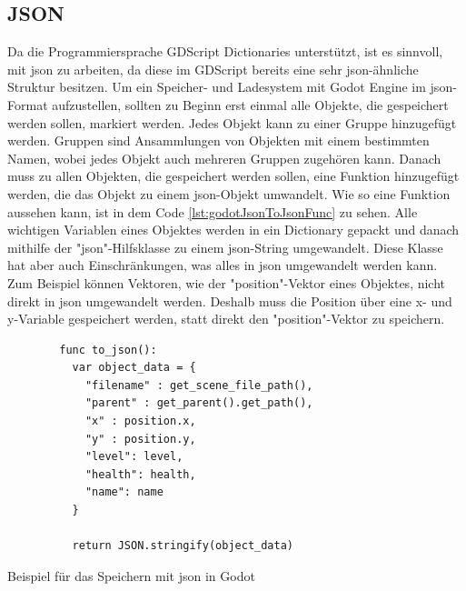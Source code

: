 \subsection{JSON}
Da die Programmiersprache GDScript Dictionaries unterstützt, ist es sinnvoll, mit \ac{json} zu arbeiten, da diese im GDScript bereits eine sehr \ac{json}-ähnliche Struktur besitzen. Um ein Speicher- und Ladesystem mit Godot Engine im \ac{json}-Format aufzustellen, sollten zu Beginn erst einmal alle Objekte, die gespeichert werden sollen, markiert werden. Jedes Objekt kann zu einer Gruppe hinzugefügt werden. Gruppen sind Ansammlungen von Objekten mit einem bestimmten Namen, wobei jedes Objekt auch mehreren Gruppen zugehören kann. Danach muss zu allen Objekten, die gespeichert werden sollen, eine Funktion hinzugefügt werden, die das Objekt zu einem \ac{json}-Objekt umwandelt. Wie so eine Funktion aussehen kann, ist in dem Code \ref{lst:godotJsonToJsonFunc} zu sehen. Alle wichtigen Variablen eines Objektes werden in ein Dictionary gepackt und danach mithilfe der "\ac{json}"-Hilfsklasse zu einem \ac{json}-String umgewandelt. Diese Klasse hat aber auch Einschränkungen, was alles in \ac{json} umgewandelt werden kann. Zum Beispiel können Vektoren, wie der "position"-Vektor eines Objektes, nicht direkt in \ac{json} umgewandelt werden. Deshalb muss die Position über eine x- und y-Variable gespeichert werden, statt direkt den "position"-Vektor zu speichern.\cite{godotengineSavingGames}

\begin{listing}[htp]
    \begin{verbatim}
        func to_json():
          var object_data = {
            "filename" : get_scene_file_path(),
            "parent" : get_parent().get_path(),
            "x" : position.x, 
            "y" : position.y,
            "level": level,
            "health": health,
            "name": name
          }

          return JSON.stringify(object_data)
    \end{verbatim}
    \caption{Beispiel für das Speichern mit \ac{json} in Godot\cite{godotengineSavingGames}}
    \label{lst:godotJsonToJsonFunc}
\end{listing}

